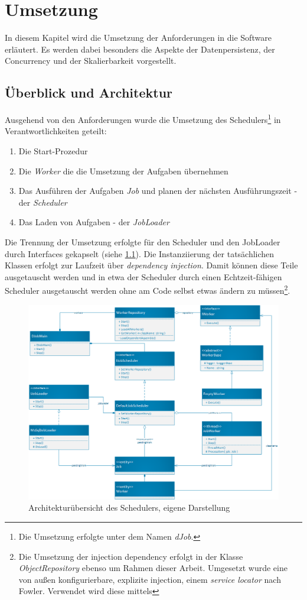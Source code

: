 \chapter{Umsetzung}\label{chap:Umsetzung}
\chapterstart
In diesem Kapitel wird die Umsetzung der Anforderungen in die Software erläutert. Es werden dabei besonders die Aspekte der Datenpersistenz, der Concurrency und der Skalierbarkeit vorgestellt.
\section{Überblick und Architektur}
Ausgehend von den Anforderungen wurde die Umsetzung des Schedulers\footnote{Die Umsetzung erfolgte unter dem Namen \textit{dJob}.} in Verantwortlichkeiten geteilt:
\begin{enumerate}
	\item Die Start-Prozedur
	\item Die \textit{Worker} die die Umsetzung der Aufgaben übernehmen
	\item Das Ausführen der Aufgaben \textit{Job} und planen der nächsten Ausführungszeit - der \textit{Scheduler}
	\item Das Laden von Aufgaben - der \textit{JobLoader}
\end{enumerate}
Die Trennung der Umsetzung erfolgte für den Scheduler und den JobLoader durch Interfaces gekapselt (siehe \ref{fig:architecture}). Die Instanziierung der tatsächlichen Klassen erfolgt zur Laufzeit über \textit{dependency injection}\cite{fowler2004}. Damit können diese Teile ausgetauscht werden und in etwa der Scheduler durch einen Echtzeit-fähigen Scheduler ausgetauscht werden ohne am Code selbst etwas ändern zu müssen\footnote{Die Umsetzung der injection dependency erfolgt in der Klasse \textit{ObjectRepository} ebenso um Rahmen dieser Arbeit. Umgesetzt wurde eine von außen konfigurierbare, explizite injection, einem \textit{service locator} nach Fowler. Verwendet wird diese mittels }.
\begin{figure}
	\centering
	\includegraphics[width=0.7\linewidth]{images/architecture.png}
	\caption{Architekturübersicht des Schedulers, eigene Darstellung}
	\label{fig:architecture}
\end{figure}
